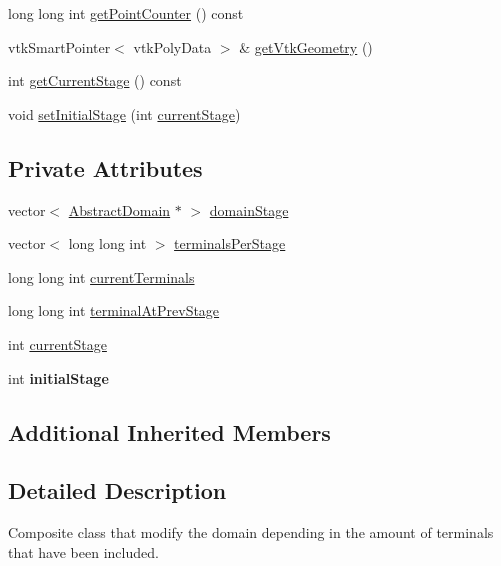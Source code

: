 \begin{DoxyCompactItemize}
\item 
long long int \hyperlink{class_staged_domain_ac794500d0ba6b4a21cd30eeda13c0b5c}{get\+Point\+Counter} () const 
\item 
vtk\+Smart\+Pointer$<$ vtk\+Poly\+Data $>$ \& \hyperlink{class_staged_domain_a69530fd545f217410433367a7e219fbf}{get\+Vtk\+Geometry} ()
\item 
int \hyperlink{class_staged_domain_a9483ed1fc5df7381f739ade92c92444f}{get\+Current\+Stage} () const 
\item 
void \hyperlink{class_staged_domain_a58e3ccb3449324920bc187bf8921b238}{set\+Initial\+Stage} (int \hyperlink{class_staged_domain_a0fc23a88dcfb07e4a2b5d3899811a2a6}{current\+Stage})
\end{DoxyCompactItemize}
\subsection*{Private Attributes}
\begin{DoxyCompactItemize}
\item 
vector$<$ \hyperlink{class_abstract_domain}{Abstract\+Domain} $\ast$ $>$ \hyperlink{class_staged_domain_a3372c80d0c3bff5255c0d4a7bbce3647}{domain\+Stage}
\item 
vector$<$ long long int $>$ \hyperlink{class_staged_domain_a8ca1e0466a1ba6563cbe103ac4499364}{terminals\+Per\+Stage}
\item 
long long int \hyperlink{class_staged_domain_a8383f99269b421f85b89c3aa847f91ce}{current\+Terminals}
\item 
long long int \hyperlink{class_staged_domain_a94b7ffac4fc6e07fc14061cdf68475b7}{terminal\+At\+Prev\+Stage}
\item 
int \hyperlink{class_staged_domain_a0fc23a88dcfb07e4a2b5d3899811a2a6}{current\+Stage}
\item 
int {\bfseries initial\+Stage}\hypertarget{class_staged_domain_aeb7e7a081ce55e7d715e317bcd34fbf7}{}\label{class_staged_domain_aeb7e7a081ce55e7d715e317bcd34fbf7}

\end{DoxyCompactItemize}
\subsection*{Additional Inherited Members}


\subsection{Detailed Description}
Composite class that modify the domain depending in the amount of terminals that have been included. 

